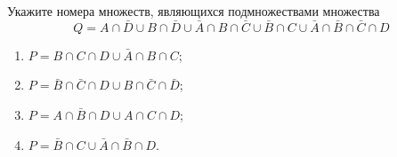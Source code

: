 \question
Укажите номера множеств, являющихся подмножествами множества
\begin{equation*}
	Q = A \cap \bar{D} \cup B \cap \bar{D} \cup \bar{A} \cap B \cap \bar{C} \cup \bar{B} \cap C \cup \bar{A} \cap \bar{B} \cap \bar{C} \cap D
\end{equation*}

\begin{enumerate}
	\renewcommand{\labelenumi}{\arabic{enumi})}
	\item $P = B \cap C \cap D \cup \bar{A} \cap B \cap C$;
	\item $P = \bar{B} \cap \bar{C} \cap D \cup B \cap \bar{C} \cap \bar{D}$;
	\item $P = A \cap \bar{B} \cap D \cup A \cap C \cap D$;
	\item $P = \bar{B} \cap C \cup \bar{A} \cap \bar{B} \cap D$.
\end{enumerate}
